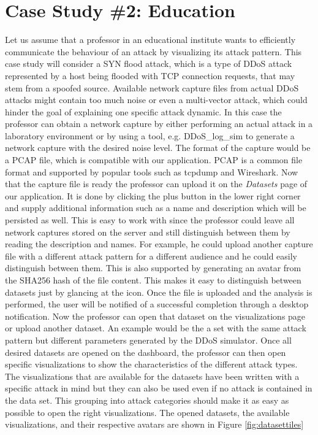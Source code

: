 \section{Case Study \#2: Education} \label{casestudyeducation}
Let us assume that a professor in an educational institute wants to efficiently communicate the behaviour of an attack by visualizing its attack pattern. This case study will consider a SYN flood attack, which is a type of DDoS attack represented by a host being flooded with TCP connection requests, that may stem from a spoofed source.
Available network capture files from actual DDoS attacks might contain too much noise or even a multi-vector attack, which could hinder the goal of explaining one specific attack dynamic. In this case the professor can obtain a network capture by either performing an actual attack in a laboratory environment or by using a tool, e.g. DDoS\_log\_sim \cite{ddoslogsim} to generate a network capture with the desired noise level. The format of the capture would be a PCAP file, which is compatible with our application. PCAP is a common file format and supported by popular tools such as tcpdump and Wireshark.
Now that the capture file is ready the professor can upload it on the \textit{Datasets} page of our application. It is done by clicking the plus button in the lower right corner and supply additional information such as a name and description which will be persisted as well. This is easy to work with since the professor could leave all network captures stored on the server and still distinguish between them by reading the description and names. For example, he could upload another capture file with a different attack pattern for a different audience and he could easily distinguish between them. This is also supported by generating an avatar from the SHA256 hash of the file content. This makes it easy to distinguish between datasets just by glancing at the icon. Once the file is uploaded and the analysis is performed, the user will be notified of a successful completion through a desktop notification. Now the professor can open that dataset on the visualizations page or upload another dataset. An example would be the a set with the same attack pattern but different parameters generated by the DDoS simulator.
Once all desired datasets are opened on the dashboard, the professor can then open specific visualizations to show the characteristics of the different attack types. The visualizations that are available for the datasets have been written with a specific attack in mind but they can also be used even if no attack is contained in the data set. This grouping into attack categories should make it as easy as possible to open the right visualizations. The opened datasets, the available visualizations, and their respective avatars are shown in Figure \ref{fig:datasettiles}

